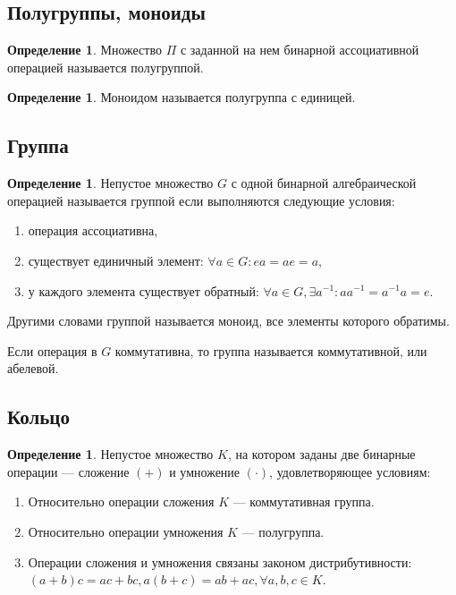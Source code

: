 \documentclass[12pt]{report}
\theoremstyle{definition}
\newtheorem{definition}[theorem]{Определение}
\begin{document}
\subsection{Полугруппы, моноиды}

\begin{definition}
Множество $\Pi$ с заданной на нем бинарной ассоциативной операцией
называется полугруппой.
\end{definition}

\begin{definition}
Моноидом называется полугруппа с единицей.
\end{definition}

\subsection{Группа}

\begin{definition}
Непустое множество $G$ с одной бинарной алгебраической операцией называется группой
если выполняются следующие условия:
\begin{enumerate}
\item операция ассоциативна,
\item существует единичный элемент: $\forall a \in G: ea = ae = a$,
\item у каждого элемента существует обратный:
  $\forall a \in G, \exists a^{-1}: a a^{-1} = a^{-1} a = e$.
\end{enumerate}


Другими словами группой называется моноид, все элементы
которого обратимы.
\end{definition}

Если операция в $G$ коммутативна, то группа называется коммутативной, или абелевой.

\subsection{Кольцо}
\begin{definition}
Непустое множество $K$, на котором заданы две бинарные операции ---
сложение $(+)$ и умножение $(\cdot)$, удовлетворяющее условиям:
\begin{enumerate}
\item Относительно операции сложения $K$ --- коммутативная группа.
\item Относительно операции умножения $K$ --- полугруппа.
\item Операции сложения и умножения связаны законом дистрибутивности:
$(a+b)c = ac + bc, a(b+c) = ab + ac, \forall a, b, c \in K$.
\end{enumerate}
\end{definition}
\end{document}
